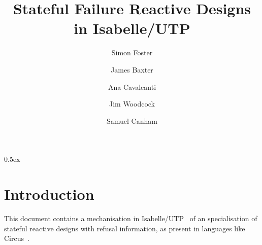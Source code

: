 \documentclass[11pt,a4paper]{article}
\begin{document}
\title{Stateful Failure Reactive Designs in Isabelle/UTP}

\author{Simon Foster \and James Baxter \and Ana Cavalcanti \and Jim Woodcock \and Samuel Canham}

\maketitle

\tableofcontents

\parindent 0pt\parskip 0.5ex

\section{Introduction}

This document contains a mechanisation in Isabelle/UTP~\cite{Foster16a} of an specialisation of
stateful reactive designs with refusal information, as present in languages like Circus~\cite{Oliveira2005-PHD}.





\end{document}
